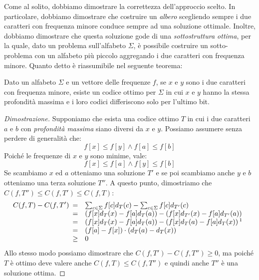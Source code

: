 \bigskip\noindent
Come al solito, dobbiamo dimostrare la correttezza dell'approccio scelto. In
particolare, dobbiamo dimostrare che costruire un \emph{albero} scegliendo
sempre i due caratteri con frequenza minore conduce sempre ad una soluzione
ottimale. Inoltre, dobbiamo dimostrare che questa soluzione gode di una
\emph{sottostruttura ottima}, per la quale, dato un problema sull'alfabeto
$\Sigma$, è possibile costruire un sotto-problema con un alfabeto più piccolo
aggregando i due caratteri con frequenza minore. Quanto detto è riassumibile
nel seguente teorema:
\begin{definition}
    Dato un alfabeto $\Sigma$ e un vettore delle frequenze $f$, se $x$ e $y$
    sono i due caratteri con frequenza minore, esiste un codice ottimo per
    $\Sigma$ in cui $x$ e $y$ hanno la stessa profondità massima e i loro codici
    differiscono solo per l'ultimo bit.
\end{definition}
\begin{proof}[Dimostrazione]
    Supponiamo che esista una codice ottimo $T$ in cui i due caratteri $a$ e $b$
    con \emph{profondità massima} siano diversi da $x$ e $y$. Possiamo assumere
    senza perdere di generalità che:
    \[f[x]\leq f[y]\wedge f[a]\leq f[b]\]
    Poiché le frequenze di $x$ e $y$ sono minime, vale:
    \[f[x]\leq f[a]\wedge f[y]\leq f[b]\]
    Se scambiamo $x$ ed $a$ otteniamo una soluzione $T'$ e se poi scambiamo
    anche $y$ e $b$ otteniamo una terza soluzione $T''$. A questo punto,
    dimostriamo che $C(f,T'')\leq C(f,T')\leq C(f,T)$:
    \[C(f,T)-C(f,T')\begin{array}[t]{cl}
        = & \sum_{c\in\Sigma} f[c]d_T(c)-\sum_{c\in\Sigma}f[c]d_{T'}(c)\\
        = & \left(f[x]d_T(x)-f[a]d_{T}(a)\right)-\left(f[x]d_{T'}(x)-
        f[a]d_{T'}(a)\right)\\
        = & \left(f[x]d_T(x)-f[a]d_{T}(a)\right)-\left(f[x]d_{T}(a)-
        f[a]d_{T}(x)\right)\footnotemark\\
        = & \left(f[a]-f[x]\right)\cdot\left(d_T(a)-d_T(x)\right)\\
        \geq & 0
    \end{array}\]
    Allo stesso modo possiamo dimostrare che $C(f,T')-C(f,T'')\geq 0$, ma
    poiché $T$ è ottimo deve valere anche $C(f,T)\leq C(f,T'')$ e quindi anche
    $T''$ è una soluzione ottima.
\end{proof}

